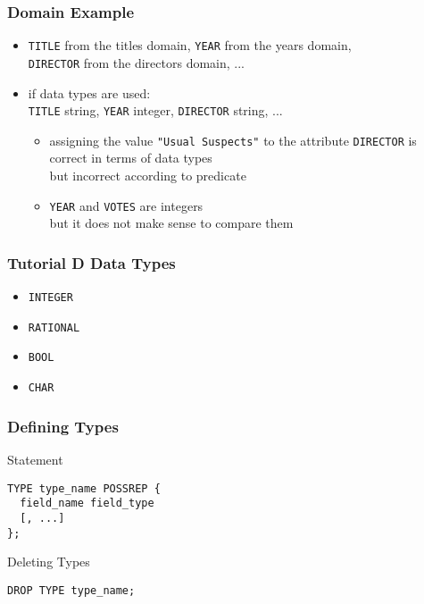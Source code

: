 \documentclass[dvipsnames]{beamer}
\theoremstyle{plain}
\begin{document}
\begin{frame}
  \frametitle{Domain Example}

  \begin{example}
    \begin{itemize}
      \item \texttt{TITLE} from the titles domain, \texttt{YEAR} from the years
        domain,\\
       \texttt{DIRECTOR} from the directors domain, ...

      \pause
      \item if data types are used:\\
        \texttt{TITLE} string, \texttt{YEAR} integer, \texttt{DIRECTOR} string,
          ...

      \begin{itemize}
        \item assigning the value \texttt{"Usual Suspects"} to the attribute
          \texttt{DIRECTOR} is correct in terms of data types\\
          but incorrect according to predicate

        \item \texttt{YEAR} and \texttt{VOTES} are integers\\
          but it does not make sense to compare them
      \end{itemize}
    \end{itemize}
  \end{example}
\end{frame}

\begin{frame}
  \frametitle{Tutorial D Data Types}

  \begin{itemize}
    \item \texttt{INTEGER}
    \item \texttt{RATIONAL}
    \item \texttt{BOOL}
    \item \texttt{CHAR}
  \end{itemize}
\end{frame}

\begin{frame}[fragile]
  \frametitle{Defining Types}

  \begin{block}{Statement}
    \begin{lstlisting}
TYPE type_name POSSREP {
  field_name field_type
  [, ...]
};
    \end{lstlisting}
  \end{block}

  \pause
  \begin{block}{Deleting Types}
    \begin{lstlisting}
DROP TYPE type_name;
    \end{lstlisting}
  \end{block}
\end{frame}
\end{document}
